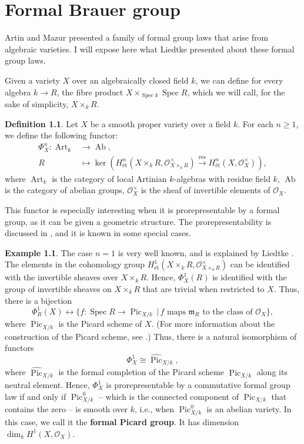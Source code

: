 \documentclass{report}
\DeclareMathOperator{\Spec}{Spec}
\DeclareMathOperator{\Art}{Art}
\DeclareMathOperator{\Ab}{Ab}
\DeclareMathOperator{\Pic}{Pic}
\theoremstyle{definition}
\newtheorem{definition}[equation]{Definition}
\newtheorem{example}[equation]{Example}
\begin{document}
\chapter{Formal Brauer group}
\label{Cha:formal-brauer-group}

Artin and Mazur \cite{artin1977formal} presented a family of formal group laws that arise from algebraic varieties. I will expose here what Liedtke \cite[Section~6.2]{liedtke2016lectures} presented about these formal group laws.

Given a variety $X$ over an algebraically closed field $k$, we can define for every algebra $k\rightarrow R$, the fibre product $X\times_{\Spec k}\Spec R$, which we will call, for the sake of simplicity, $X\times_kR$.

\begin{definition}
Let $X$ be a smooth proper variety over a field $k$. For each $n\geq1$, we define the following functor:
\begin{align*}
\Phi_X^n:\Art_k&\longrightarrow\Ab,\\
R&\longmapsto\ker\left(H_{\text{\'{e}t}}^n(X\times_kR,\mathcal{O}_{X\times_kR}^{\times})\xrightarrow{\text{res}}H_{\text{\'{e}t}}^n(X,\mathcal{O}_X^{\times})\right),
\end{align*}
where $\Art_k$ is the category of local Artinian $k$-algebras with residue field $k$, $\Ab$ is the category of abelian groups, $\mathcal{O}_X^{\times}$ is the sheaf of invertible elements of $\mathcal{O}_X$.
\end{definition}

This functor is especially interesting when it is prorepresentable by a formal group, as it can be given a geometric structure. The prorepresentability is discussed in \cite{artin1977formal}, and it is known in some special cases.

\begin{example}
The case $n=1$ is very well known, and is explained by Liedtke \cite[Example~6.14]{liedtke2016lectures}. The elements in the cohomology group $H_{\text{\'{e}t}}^1(X\times_kR,\mathcal{O}_{X\times_kR}^{\times})$ can be identified with the invertible sheaves over $X\times_kR$. Hence, $\Phi_X^1(R)$ is identified with the group of invertible sheaves on $X\times_kR$ that are trivial when restricted to $X$. Thus, there is a bijection
\[\Phi_R^1(X)\longleftrightarrow\{f:\Spec R\rightarrow\Pic_{X/k}\,|\,f\text{ maps }\mathfrak{m}_R\text{ to the class of }\mathcal{O}_X\},\]
where $\Pic_{X/k}$ is the Picard scheme of $X$. (For more information about the construction of the Picard scheme, see \cite{kleiman2005picard}.) Thus, there is a natural isomorphism of functors
\[\Phi_X^1\cong\widehat{\Pic}_{X/k},\]
where $\widehat{\Pic}_{X/k}$ is the formal completion of the Picard scheme $\Pic_{X/k}$ along its neutral element. Hence, $\Phi_X^1$ is prorepresentable by a commutative formal group law if and only if $\Pic_{X/k}^0$ -- which is the connected component of $\Pic_{X/k}$ that contains the zero -- is smooth over $k$, i.e., when $\Pic_{X/k}^0$ is an abelian variety. In this case, we call it the \textbf{formal Picard group}. It has dimension $\dim_kH^1(X,\mathcal{O}_X)$.
\end{example}
\end{document}
